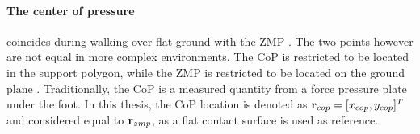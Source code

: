 \paragraph{The center of pressure} coincides during walking over flat ground with the \ac{ZMP} \cite{vukobratovic2004zero}. The two points however are not equal in more complex environments. The \ac{CoP} is restricted to be located in the support polygon, while the \ac{ZMP} is restricted to be located on the ground plane  \cite{sardain2004forces}. Traditionally, the \ac{CoP} is a measured quantity from a force pressure plate under the foot. In this thesis, the \ac{CoP} location is denoted as $\mathbf{r}_{cop} = [x_{cop}, y_{cop}]^T$ and considered equal to $\mathbf{r}_{zmp}$, as a flat contact surface is used as reference.
